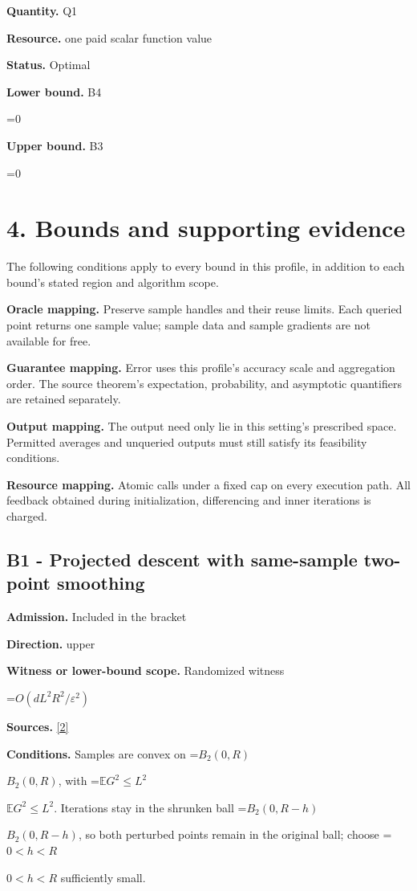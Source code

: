 \documentclass[10pt,a4paper]{article}
\newcommand{\AtlasMath}[1]{\par\begingroup\centering\setbox0=\hbox{$\displaystyle #1$}\ifdim\wd0>1.4\linewidth\typeout{ATLAS WIDE FORMULA: \the\wd0}\fi\ifdim\wd0>\linewidth\resizebox{\linewidth}{!}{\box0}\else\box0\fi\par\endgroup}
\newcommand{\AtlasInlineMath}[1]{\begingroup\setbox0=\hbox{$#1$}\ifdim\wd0>.4\linewidth\endgroup\AtlasMath{#1}\else\endgroup$#1$\fi}
\begin{document}
\textbf{Quantity.} Q1

\textbf{Resource.} one paid scalar function value

\textbf{Status.} Optimal

\textbf{Lower bound.} B4

\AtlasMath{0}
\textbf{Upper bound.} B3

\AtlasMath{0}
\section{4. Bounds and supporting evidence}
The following conditions apply to every bound in this profile, in addition to each bound's stated region and algorithm scope.

\textbf{Oracle mapping.} Preserve sample handles and their reuse limits. Each queried point returns one sample value; sample data and sample gradients are not available for free.

\textbf{Guarantee mapping.} Error uses this profile's accuracy scale and aggregation order. The source theorem's expectation, probability, and asymptotic quantifiers are retained separately.

\textbf{Output mapping.} The output need only lie in this setting's prescribed space. Permitted averages and unqueried outputs must still satisfy its feasibility conditions.

\textbf{Resource mapping.} Atomic calls under a fixed cap on every execution path. All feedback obtained during initialization, differencing and inner iterations is charged.

\subsection{B1 - Projected descent with same-sample two-point smoothing}
\textbf{Admission.} Included in the bracket

\textbf{Direction.} upper

\textbf{Witness or lower-bound scope.} Randomized witness

\AtlasMath{O(dL^2R^2/\varepsilon^2)}
\textbf{Sources.} \href{https://jmlr.org/papers/volume18/16-632/16-632.pdf}{[2]}

\textbf{Conditions.} Samples are convex on \AtlasInlineMath{B_2(0,R)}, with \AtlasInlineMath{\mathbb{E} G^2\le L^2}. Iterations stay in the shrunken ball \AtlasInlineMath{B_2(0,R-h)}, so both perturbed points remain in the original ball; choose \AtlasInlineMath{0<h<R} sufficiently small.
\end{document}

